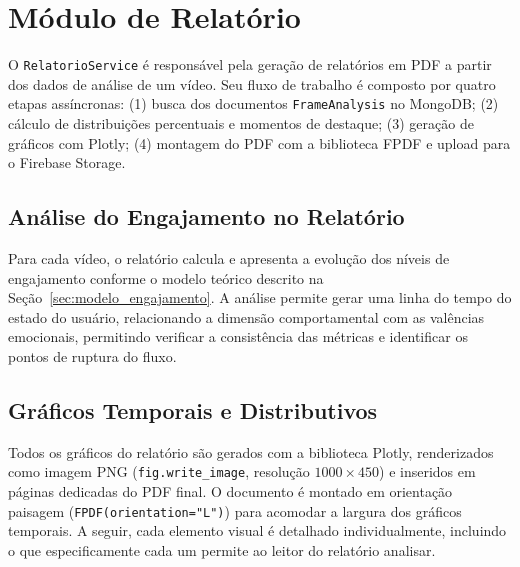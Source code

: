 \documentclass[
	12pt,
	openright,
	oneside,
	a4paper,
	english,
	brazil
	]{abntex2}
\begin{document}
\section{Módulo de Relatório}

O \texttt{RelatorioService} é responsável pela geração de relatórios em PDF a partir dos dados de análise de um vídeo. Seu fluxo de trabalho é composto por quatro etapas assíncronas: (1) busca dos documentos \texttt{FrameAnalysis} no MongoDB; (2) cálculo de distribuições percentuais e momentos de destaque; (3) geração de gráficos com Plotly; (4) montagem do PDF com a biblioteca FPDF e upload para o Firebase Storage.

\subsection{Análise do Engajamento no Relatório}

Para cada vídeo, o relatório calcula e apresenta a evolução dos níveis de engajamento conforme o modelo teórico descrito na Seção~\ref{sec:modelo_engajamento}. A análise permite gerar uma linha do tempo do estado do usuário, relacionando a dimensão comportamental com as valências emocionais, permitindo verificar a consistência das métricas e identificar os pontos de ruptura do fluxo.

\subsection{Gráficos Temporais e Distributivos}
\label{sec:graficos_relatorio}

Todos os gráficos do relatório são gerados com a biblioteca Plotly, renderizados como imagem PNG (\texttt{fig.write\_image}, resolução $1000\times450$) e inseridos em páginas dedicadas do PDF final. O documento é montado em orientação paisagem (\texttt{FPDF(orientation="L")}) para acomodar a largura dos gráficos temporais. A seguir, cada elemento visual é detalhado individualmente, incluindo o que especificamente cada um permite ao leitor do relatório analisar.
\end{document}
